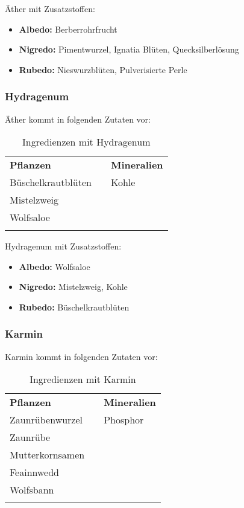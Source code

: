 Äther mit Zusatzstoffen:
\begin{itemize}
\item \textbf{Albedo:} Berberrohrfrucht
\item \textbf{Nigredo:} Pimentwurzel, Ignatia Blüten, Quecksilberlösung
\item \textbf{Rubedo:} Nieswurzblüten, Pulverisierte Perle
\end{itemize}


\subsubsection{Hydragenum}
Äther kommt in folgenden Zutaten vor:
\begin{longtable}{p{5cm}p{2cm}p{5cm}}
\textbf{Pflanzen} & & \textbf{Mineralien} \\ \cline{1-1} \cline{3-3}
Büschelkrautblüten & & Kohle \\ 
Mistelzweig & &  \\ 
Wolfsaloe  & &  \\

\caption{Ingredienzen mit Hydragenum}
\label{tab:ingredienzen_mit_hydragenum}
\end{longtable}

Hydragenum mit Zusatzstoffen:
\begin{itemize}
\item \textbf{Albedo:} Wolfsaloe
\item \textbf{Nigredo:} Mistelzweig, Kohle
\item \textbf{Rubedo:} Büschelkrautblüten
\end{itemize}


\subsubsection{Karmin}
Karmin kommt in folgenden Zutaten vor:
\begin{longtable}{p{5cm}p{2cm}p{5cm}}
\textbf{Pflanzen} & & \textbf{Mineralien} \\ \cline{1-1} \cline{3-3}
Zaunrübenwurzel & & Phosphor \\
Zaunrübe & & \\
Mutterkornsamen & & \\
Feainnwedd & & \\
Wolfsbann  & & \\

\caption{Ingredienzen mit Karmin}
\label{tab:ingredienzen_mit_karmin}
\end{longtable}

